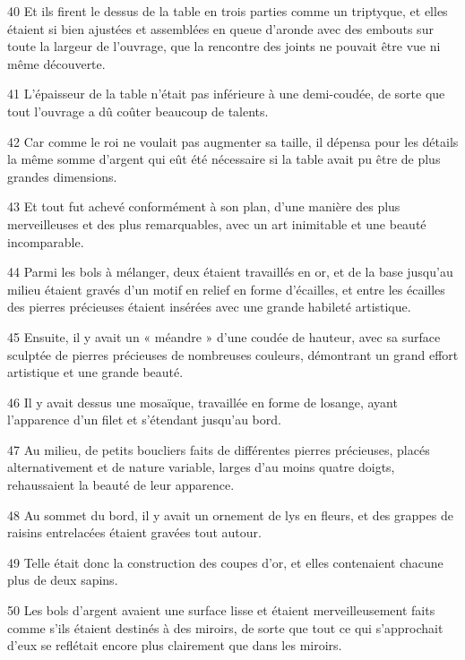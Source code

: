 \par 40 Et ils firent le dessus de la table en trois parties comme un triptyque, et elles étaient si bien ajustées et assemblées en queue d'aronde avec des embouts sur toute la largeur de l'ouvrage, que la rencontre des joints ne pouvait être vue ni même découverte.

\par 41 L'épaisseur de la table n'était pas inférieure à une demi-coudée, de sorte que tout l'ouvrage a dû coûter beaucoup de talents.

\par 42 Car comme le roi ne voulait pas augmenter sa taille, il dépensa pour les détails la même somme d'argent qui eût été nécessaire si la table avait pu être de plus grandes dimensions.

\par 43 Et tout fut achevé conformément à son plan, d'une manière des plus merveilleuses et des plus remarquables, avec un art inimitable et une beauté incomparable.

\par 44 Parmi les bols à mélanger, deux étaient travaillés en or, et de la base jusqu'au milieu étaient gravés d'un motif en relief en forme d'écailles, et entre les écailles des pierres précieuses étaient insérées avec une grande habileté artistique.

\par 45 Ensuite, il y avait un « méandre » d’une coudée de hauteur, avec sa surface sculptée de pierres précieuses de nombreuses couleurs, démontrant un grand effort artistique et une grande beauté.

\par 46 Il y avait dessus une mosaïque, travaillée en forme de losange, ayant l'apparence d'un filet et s'étendant jusqu'au bord.

\par 47 Au milieu, de petits boucliers faits de différentes pierres précieuses, placés alternativement et de nature variable, larges d'au moins quatre doigts, rehaussaient la beauté de leur apparence.

\par 48 Au sommet du bord, il y avait un ornement de lys en fleurs, et des grappes de raisins entrelacées étaient gravées tout autour.

\par 49 Telle était donc la construction des coupes d'or, et elles contenaient chacune plus de deux sapins.

\par 50 Les bols d'argent avaient une surface lisse et étaient merveilleusement faits comme s'ils étaient destinés à des miroirs, de sorte que tout ce qui s'approchait d'eux se reflétait encore plus clairement que dans les miroirs.


